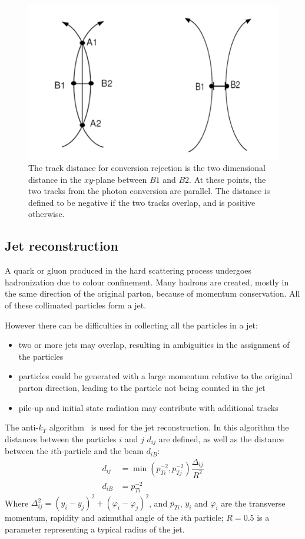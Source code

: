 \begin{figure}[htbp]
    \centering
    \includegraphics[width=.7\textwidth]{images/pdf/dist}

    \caption{The track distance for conversion rejection is the two
    dimensional distance in the $xy$-plane between $B1$ and $B2$. At these
points, the two tracks from the photon conversion are parallel. The distance
is defined to be negative if the two tracks overlap, and is positive
otherwise.}
    \label{fig:dist}
\end{figure}

\subsection{Jet reconstruction}\label{sec:jet_reco}
A quark or gluon produced in the hard scattering process undergoes
hadronization due to colour confinement. Many hadrons are created, mostly in
the same direction of the original parton, because of momentum conservation.
All of these collimated particles form a jet.

However there can be difficulties in collecting all the particles in a jet:
\begin{itemize}
    \item two or more jets may overlap, resulting in ambiguities in the assignment of the particles
    \item particles could be generated with a large momentum relative to the
        original parton direction, leading to the particle not being counted
        in the jet
    \item pile-up and initial state radiation may contribute with additional
        tracks 
\end{itemize}
The anti-$k_T$ algorithm~\cite{antikt} is used for the jet reconstruction. In this
algorithm the distances between the particles $i$ and $j$ $d_{ij}$ are defined, as well
as the distance between the $i$th-particle and the beam $d_{iB}$:
\begin{align*}
    d_{ij} &= \min(p_{Ti}^{-2}, p_{Tj}^{-2})\dfrac{\Delta_{ij}}{R^2}\\
    d_{iB} &= p_{Ti}^{-2}
\end{align*}
Where $\Delta_{ij}^2 = (y_i - y_j)^2 + (\varphi_i - \varphi_j)^2$, and
$p_{Ti}$, $y_i$ and $\varphi_i$ are the transverse momentum, rapidity and
azimuthal angle of the $i$th particle; $R = 0.5$ is a parameter representing a
typical radius of the jet.

